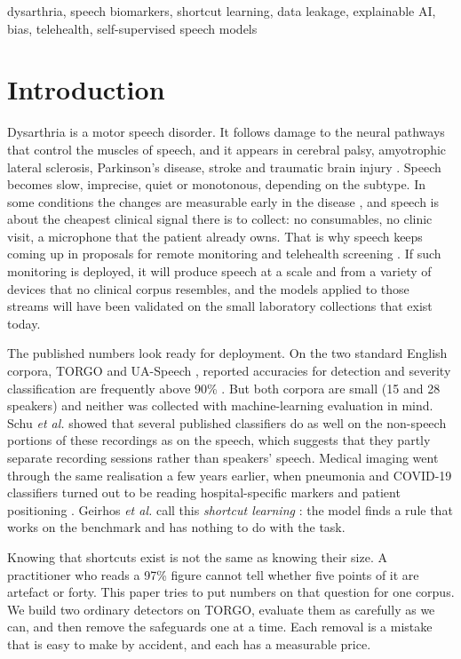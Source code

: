 \documentclass[conference]{IEEEtran}
\begin{document}
\begin{IEEEkeywords}
dysarthria, speech biomarkers, shortcut learning, data leakage, explainable AI, bias, telehealth, self-supervised speech models
\end{IEEEkeywords}

\section{Introduction}
Dysarthria is a motor speech disorder. It follows damage to the neural pathways that control the muscles of speech, and it appears in cerebral palsy, amyotrophic lateral sclerosis, Parkinson's disease, stroke and traumatic brain injury \cite{duffy2020,darley1969}. Speech becomes slow, imprecise, quiet or monotonous, depending on the subtype. In some conditions the changes are measurable early in the disease \cite{rusz2011}, and speech is about the cheapest clinical signal there is to collect: no consumables, no clinic visit, a microphone that the patient already owns. That is why speech keeps coming up in proposals for remote monitoring and telehealth screening \cite{moro2021}. If such monitoring is deployed, it will produce speech at a scale and from a variety of devices that no clinical corpus resembles, and the models applied to those streams will have been validated on the small laboratory collections that exist today.

The published numbers look ready for deployment. On the two standard English corpora, TORGO \cite{rudzicz2012} and UA-Speech \cite{kim2008}, reported accuracies for detection and severity classification are frequently above 90\% \cite{joshy2022,javanmardi2023,schu2023}. But both corpora are small (15 and 28 speakers) and neither was collected with machine-learning evaluation in mind. Schu \emph{et al.} \cite{schu2023} showed that several published classifiers do as well on the non-speech portions of these recordings as on the speech, which suggests that they partly separate recording sessions rather than speakers' speech. Medical imaging went through the same realisation a few years earlier, when pneumonia and COVID-19 classifiers turned out to be reading hospital-specific markers and patient positioning \cite{zech2018,degrave2021,roberts2021}. Geirhos \emph{et al.} call this \emph{shortcut learning} \cite{geirhos2020}: the model finds a rule that works on the benchmark and has nothing to do with the task.

Knowing that shortcuts exist is not the same as knowing their size. A practitioner who reads a 97\% figure cannot tell whether five points of it are artefact or forty. This paper tries to put numbers on that question for one corpus. We build two ordinary detectors on TORGO, evaluate them as carefully as we can, and then remove the safeguards one at a time. Each removal is a mistake that is easy to make by accident, and each has a measurable price.
\end{document}
